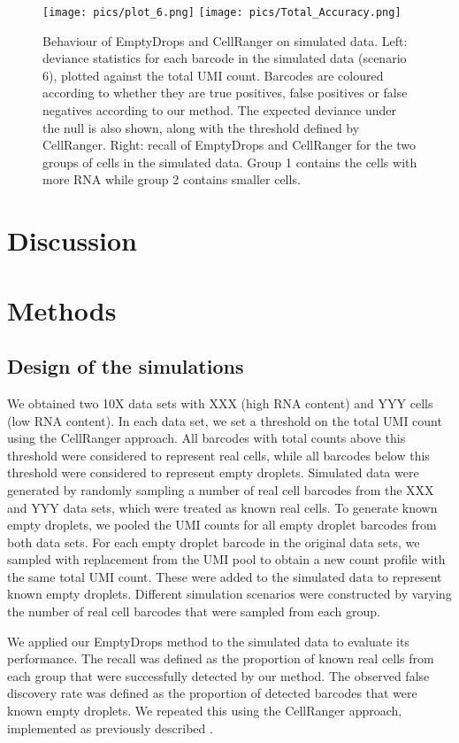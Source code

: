 \documentclass[10pt,letterpaper]{article}
\begin{document}
\begin{figure}[bt]
\begin{center}
    \texttt{[image: pics/plot\_6.png]}
    \texttt{[image: pics/Total\_Accuracy.png]}
\end{center}
\caption{Behaviour of EmptyDrops and CellRanger on simulated data.
    Left: deviance statistics for each barcode in the simulated data (scenario 6), plotted against the total UMI count.
    Barcodes are coloured according to whether they are true positives, false positives or false negatives according to our method.
    The expected deviance under the null is also shown, along with the threshold defined by CellRanger.
    Right: recall of EmptyDrops and CellRanger for the two groups of cells in the simulated data.
    Group 1 contains the cells with more RNA while group 2 contains smaller cells.
}
\label{fig:demo}
\end{figure}


\section*{Discussion}

\section*{Methods}

\subsection*{Design of the simulations}
We obtained two 10X data sets with XXX (high RNA content) and YYY cells (low RNA content).
In each data set, we set a threshold on the total UMI count using the CellRanger approach.
All barcodes with total counts above this threshold were considered to represent real cells, while all barcodes below this threshold were considered to represent empty droplets.
Simulated data were generated by randomly sampling a number of real cell barcodes from the XXX and YYY data sets, which were treated as known real cells.
To generate known empty droplets, we pooled the UMI counts for all empty droplet barcodes from both data sets. 
For each empty droplet barcode in the original data sets, we sampled with replacement from the UMI pool to obtain a new count profile with the same total UMI count.
These were added to the simulated data to represent known empty droplets.
Different simulation scenarios were constructed by varying the number of real cell barcodes that were sampled from each group.

We applied our EmptyDrops method to the simulated data to evaluate its performance.
The recall was defined as the proportion of known real cells from each group that were successfully detected by our method.
The observed false discovery rate was defined as the proportion of detected barcodes that were known empty droplets.
We repeated this using the CellRanger approach, implemented as previously described \cite{zheng2017massively}.



\end{document}
